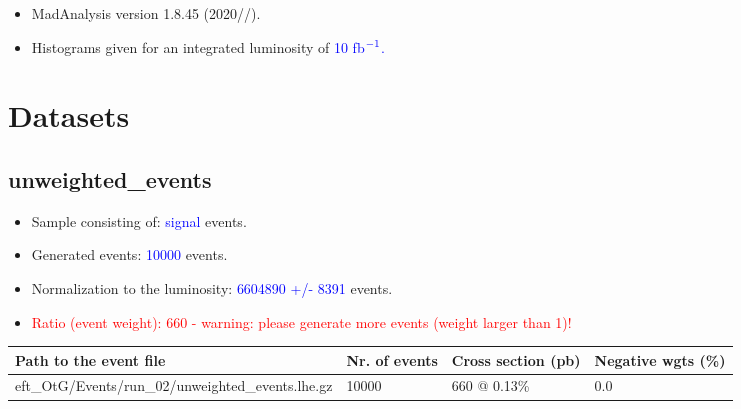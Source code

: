 \documentclass[a4paper, 10pt]{article}
\begin{document}
\begin{itemize}
  \item MadAnalysis version 1.8.45 (2020//).
   \item Histograms given for an integrated luminosity of \textcolor{blue}{10}\textcolor{blue}{ fb}$^{\textcolor{blue}{-1}}$\textcolor{blue}{.}
\textcolor{blue}{}
\end{itemize}
\newpage
\section{ Datasets}

\subsection{ unweighted\_events}

\begin{itemize}
  \item Sample consisting of: \textcolor{blue}{signal}  events.
   \item Generated events: \textcolor{blue}{10000 }  events.
   \item Normalization to the luminosity: \textcolor{blue}{6604890}\textcolor{blue}{ +/\-- }\textcolor{blue}{8391 }  events.
   \item\textcolor{red}{Ratio (event weight): }\textcolor{red}{660 }\textcolor{red}{ - warning: please generate more events (weight larger than 1)!}
\textcolor{red}{}
\end{itemize}
\begin{table}[H]
  \begin{center}
    \begin{tabular}{|m{55.0mm}|m{25.0mm}|m{30.0mm}|m{30.0mm}|}
      \hline
      {\cellcolor{yellow}         Path to the event file}& {\cellcolor{yellow}         Nr. of events}& {\cellcolor{yellow}         Cross section (pb)}& {\cellcolor{yellow}         Negative wgts (\%)}\\
      \hline
      {\cellcolor{white}          eft\_OtG/\-Events/\-run\_02/\-unweighted\_events.lhe.gz}& {\cellcolor{white}          10000}& {\cellcolor{white}          660 @ 0.13\%}& {\cellcolor{white}          0.0}\\
\hline
    \end{tabular}
  \end{center}
\end{table}
\end{document}
